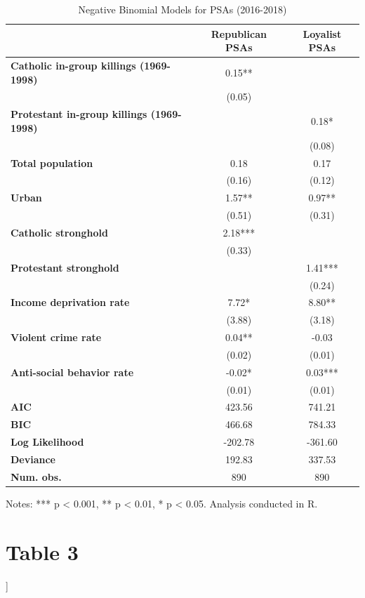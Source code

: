 \documentclass[12pt,letterpaper]{article}
\begin{document}
	\begin{table}[htbp]
		\centering
		\caption{Negative Binomial Models for PSAs (2016-2018)}
		\begin{tabular}{lcc}
			\toprule
			& \textbf{Republican PSAs} & \textbf{Loyalist PSAs} \\
			\midrule
			\textbf{Catholic in-group killings (1969-1998)} & 0.15** & \\
			& (0.05) & \\
			\textbf{Protestant in-group killings (1969-1998)} & & 0.18* \\
			& & (0.08) \\
			\textbf{Total population} & 0.18 & 0.17 \\
			& (0.16) & (0.12) \\
			\textbf{Urban} & 1.57** & 0.97** \\
			& (0.51) & (0.31) \\
			\textbf{Catholic stronghold} & 2.18*** & \\
			& (0.33) & \\
			\textbf{Protestant stronghold} & & 1.41*** \\
			& & (0.24) \\
			\textbf{Income deprivation rate} & 7.72* & 8.80** \\
			& (3.88) & (3.18) \\
			\textbf{Violent crime rate} & 0.04** & -0.03 \\
			& (0.02) & (0.01) \\
			\textbf{Anti-social behavior rate} & -0.02* & 0.03*** \\
			& (0.01) & (0.01) \\
			\midrule
			\textbf{AIC} & 423.56 & 741.21 \\
			\textbf{BIC} & 466.68 & 784.33 \\
			\textbf{Log Likelihood} & -202.78 & -361.60 \\
			\textbf{Deviance} & 192.83 & 337.53 \\
			\textbf{Num. obs.} & 890 & 890 \\
			\bottomrule
		\end{tabular}
		\label{tab:negative_binomial}
		\medskip
		\small
		\raggedright
		Notes: *** p < 0.001, ** p < 0.01, * p < 0.05. Analysis conducted in R.
	\end{table}
	\newpage
\section*{Table 3}
	]
	
\end{document}
